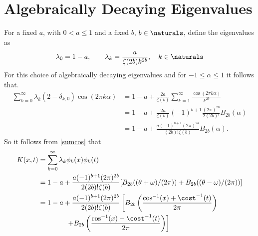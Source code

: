 \documentclass[]{elsarticle}
\theoremstyle{definition}
\begin{document}
\section{Algebraically Decaying Eigenvalues}
For a fixed $a$, with $0<a\le 1$ and a fixed $b$, $b \in \naturals$, define the eigenvalues as
\begin{equation}
\lambda_0=1-a, \qquad \lambda_k = \frac{a}{\zeta(2b)k^{2b}}, \quad k \in \naturals
\end{equation}
For this choice of algebraically decaying eigenvalues and for $-1 \le \alpha \le 1$ it follows that.
\begin{align*}
\sum_{k=0}^{\infty} \lambda_k (2-\delta_{k,0}) \cos(2 \pi k\alpha)
&= 1-a + \frac{2a}{\zeta(b)}\sum_{k=1}^{\infty} \frac{\cos(2 \pi k\alpha)}{k^{2b}}\\
&= 1-a + \frac{2a}{\zeta(b)} (-1)^{b+1} \frac{(2 \pi)^{2b}} {2 (2b)!} B_{2b}(\alpha) \\
&= 1-a + \frac{a (-1)^{b+1}(2 \pi)^{2b}}{(2b)!\zeta(b)} B_{2b}(\alpha).
\end{align*}
So it follows from \eqref{sumcos} that
\begin{align*}
K(x,t) &= \sum_{k=0}^{\infty} \lambda_k \phi_k(x)\phi_k(t) \\
&= 1-a + \frac{a (-1)^{b+1}(2 \pi)^{2b}}{2(2b)!\zeta(b)} [B_{2b}((\theta + \omega)/(2\pi)) + B_{2b}((\theta - \omega)/(2\pi))]\\
&= 1-a + \frac{a (-1)^{b+1}(2 \pi)^{2b}}{2(2b)!\zeta(b)} \left[B_{2b}\left(\frac{\cos^{-1}(x) + \cost^{-1}(t)}{2\pi}\right) \right .  \\
& \qquad \qquad \left. + B_{2b}\left(\frac{\cos^{-1}(x) - \cost^{-1}(t)}{2\pi}\right) \right]
\end{align*}



\end{document}
